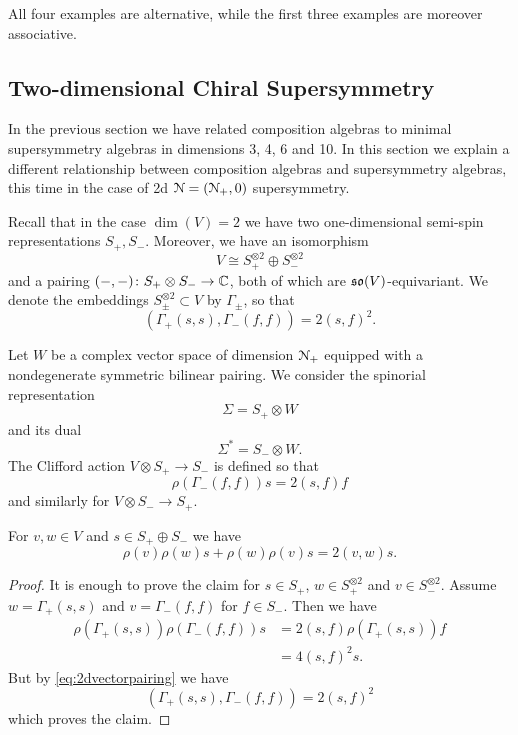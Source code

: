 \documentclass[10pt, oneside]{article}
\begin{document}
All four examples are alternative, while the first three examples are moreover associative.

\subsection{Two-dimensional Chiral Supersymmetry} \label{sect:2dchiral}

In the previous section we have related composition algebras to minimal supersymmetry algebras in dimensions 3, 4, 6 and 10. In this section we explain a different relationship between composition algebras and supersymmetry algebras, this time in the case of 2d $\mathcal N=(\mathcal N_+, 0)$ supersymmetry.

Recall that in the case $\dim(V) = 2$ we have two one-dimensional semi-spin representations $S_+, S_-$. Moreover, we have an isomorphism
\[V\cong S_+^{\otimes 2}\oplus S_-^{\otimes 2}\]
and a pairing $( -, -)\colon S_+\otimes S_-\rightarrow \mathbb C$, both of which are $\mathfrak{so}(V)$-equivariant. We denote the embeddings $S_{\pm}^{\otimes 2}\subset V$ by $\Gamma_{\pm}$, so that
\begin{equation}
(\Gamma_+(s, s), \Gamma_-(f, f)) = 2(s, f)^2.
\label{eq:2dvectorpairing}
\end{equation}

Let $W$ be a complex vector space of dimension $\mathcal N_+$ equipped with a nondegenerate symmetric bilinear pairing. We consider the spinorial representation
\[\Sigma = S_+\otimes W\]
and its dual
\[\Sigma^* = S_-\otimes W.\]
The Clifford action $V\otimes S_+\rightarrow S_-$ is defined so that
\[\rho(\Gamma_-(f, f)) s = 2(s, f) f\]
and similarly for $V\otimes S_-\rightarrow S_+$.

\begin{prop}
For $v,w\in V$ and $s\in S_+\oplus S_-$ we have
\[\rho(v)\rho(w)s + \rho(w)\rho(v) s = 2(v, w) s.\]
\end{prop}
\begin{proof}
It is enough to prove the claim for $s\in S_+$, $w\in S_+^{\otimes 2}$ and $v\in S_-^{\otimes 2}$. Assume $w=\Gamma_+(s, s)$ and $v = \Gamma_-(f, f)$ for $f\in S_-$. Then we have
\begin{align*}
\rho(\Gamma_+(s, s)) \rho(\Gamma_-(f, f)) s &= 2(s, f) \rho(\Gamma_+(s, s)) f \\
&= 4(s, f)^2 s.
\end{align*}
But by \eqref{eq:2dvectorpairing} we have
\[(\Gamma_+(s, s), \Gamma_-(f, f)) = 2(s, f)^2\]
which proves the claim.
\end{proof}
\end{document}
